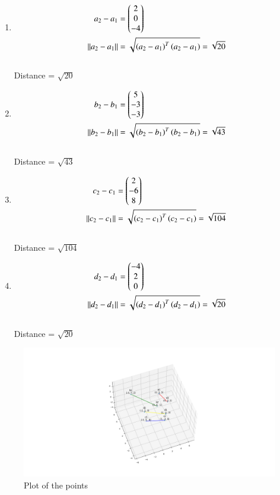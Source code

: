 \documentclass[journal]{IEEEtran}
\begin{document}
\begin{enumerate}
\item 
\begin{align}
	a_2-a_1 &= \begin{pmatrix}
		2\\
		0\\
		-4\\
	\end{pmatrix}\\
	\left\lVert a_2-a_1\right\rVert &= \sqrt{\left(a_2-a_1\right)^T \left(a_2-a_1\right)} = \sqrt{20}
\end{align}\\
Distance = $\sqrt{20}$
\item 
\begin{align}
	b_2-b_1 &= \begin{pmatrix}
		5\\
		-3\\
		-3\\
	\end{pmatrix}\\
	\left\lVert b_2-b_1\right\rVert &= \sqrt{\left(b_2-b_1\right)^T \left(b_2-b_1\right)} = \sqrt{43}
\end{align}\\
Distance = $\sqrt{43}$

\item 
\begin{align}
	c_2-c_1 &= \begin{pmatrix}
		2\\
		-6\\
		8\\
	\end{pmatrix}\\
	\left\lVert c_2-c_1\right\rVert &= \sqrt{\left(c_2-c_1\right)^T \left(c_2-c_1\right)} = \sqrt{104}
\end{align}\\
Distance = $\sqrt{104}$
\item 
\begin{align}
	d_2-d_1 &= \begin{pmatrix}
		-4\\
		2\\
		0\\
	\end{pmatrix}\\
	\left\lVert d_2-d_1\right\rVert &= \sqrt{\left(d_2-d_1\right)^T \left(d_2-d_1\right)} = \sqrt{20}
\end{align}\\
Distance = $\sqrt{20}$
\centering
\end{enumerate}
\begin{figure}[h!]
   \centering
   \includegraphics[width = 15cm]{figs/Figure_1.png}
   \caption{Plot of the points}
   \label{stemplot}
\end{figure}
\end{document}
